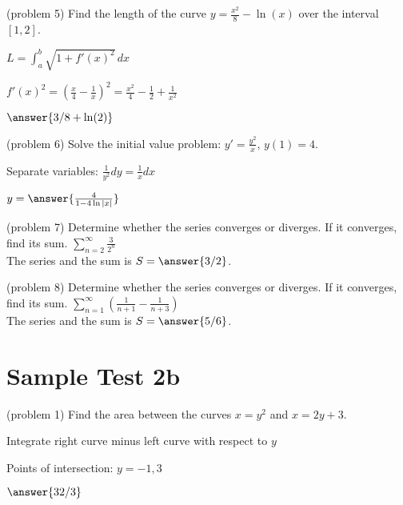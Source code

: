 \documentclass[handout]{ximera}
\begin{document}
\begin{problem}(problem 5)
Find the length of the curve $\displaystyle y = \frac{x^2}{8} - \ln(x)$ over the interval $[1, 2]$.\\
\begin{hint}
$L = \int_a^b \sqrt{1 + f'(x)^2} \, dx$
\end{hint}
\begin{hint}
$\displaystyle f'(x)^2 =\left(\frac{x}{4} - \frac{1}{x}\right)^2 
= \frac{x^2}{4} - \frac{1}{2} + \frac{1}{x^2}$
\end{hint}
$\answer{3/8 + \ln(2)}$
\end{problem}


\begin{problem}(problem 6)
Solve the initial value problem: $\displaystyle y' = \frac{y^2}{x},\, y(1) = 4$.\\
\begin{hint}
Separate variables: $\frac{1}{y^2} dy = \frac{1}{x} dx$
\end{hint}
$y = \answer{\frac{4}{1- 4\ln|x|}}$
\end{problem}


\begin{problem}(problem 7)
Determine whether the series converges or diverges.  If it converges, find its sum. $\displaystyle \sum_{n=2}^\infty \frac{3}{2^n}$\\
The series  and the sum is $S = \answer{3/2}$.
\end{problem}

\begin{problem}(problem 8)
Determine whether the series converges or diverges.  If it converges, find its sum. $\displaystyle \sum_{n=1}^\infty \left(\frac{1}{n+1} - \frac{1}{n+3}\right)$\\
The series  and the sum is $S = \answer{5/6}$.
\end{problem}

\section{Sample Test 2b}

\begin{problem}(problem 1)
Find the area between the curves $x = y^2$ and $x = 2y + 3$.\\
\begin{hint}
Integrate right curve minus left curve with respect to $y$
\end{hint}
\begin{hint}
Points of intersection: $y = -1, 3$
\end{hint}
$\answer{32/3}$
\end{problem}
\end{document}
